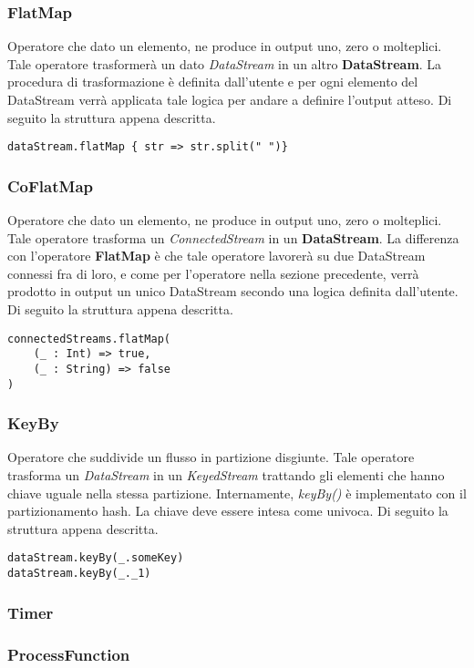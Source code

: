 \subsubsection{FlatMap}
Operatore che dato un elemento, ne produce in output uno, zero o molteplici. Tale operatore trasformerà un dato \textit{DataStream} in un altro \textbf{DataStream}. La procedura di trasformazione è definita dall'utente e per ogni elemento del DataStream verrà applicata tale logica per andare a definire l'output atteso. Di seguito la struttura appena descritta.

\begin{verbatim}
dataStream.flatMap { str => str.split(" ")}
\end{verbatim}
	
	
\subsubsection{CoFlatMap}
Operatore che dato un elemento, ne produce in output uno, zero o molteplici. Tale operatore trasforma un \textit{ConnectedStream} in un \textbf{DataStream}. La differenza con l'operatore \textbf{FlatMap} è che tale operatore lavorerà su due DataStream connessi fra di loro, e come per l'operatore nella sezione precedente, verrà prodotto in output un unico DataStream secondo una logica definita dall'utente. Di seguito la struttura appena descritta.

\begin{verbatim}
connectedStreams.flatMap(
    (_ : Int) => true,
    (_ : String) => false
)
\end{verbatim}

\subsubsection{KeyBy}
Operatore che suddivide un flusso in partizione disgiunte. Tale operatore trasforma un \textit{DataStream} in un \textit{KeyedStream} trattando gli elementi che hanno chiave uguale nella stessa partizione. Internamente, \textit{keyBy()} è implementato con il partizionamento hash.
La chiave deve essere intesa come univoca.
Di seguito la struttura appena descritta.
\begin{verbatim}
dataStream.keyBy(_.someKey)
dataStream.keyBy(_._1)
\end{verbatim}
\subsubsection{Timer}
\subsubsection{ProcessFunction}



